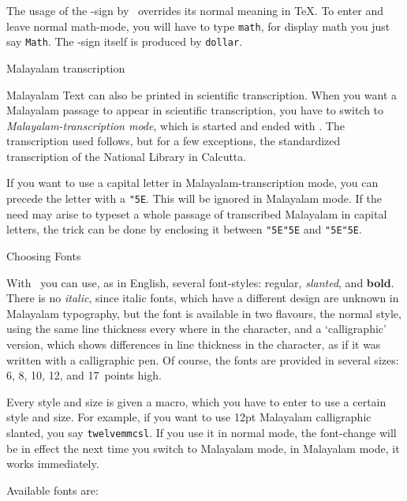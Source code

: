 The usage of the {\tt\dollar}-sign by \MT\ overrides its normal
meaning in
\TeX. To enter and leave normal math-mode, you will have to type
{\tt\bslash math}, for display math you just say {\tt\bslash Math}.
The \dollar-sign itself is produced by {\tt\bslash dollar}.

\beginsection Malayalam transcription

Malayalam Text can also be printed in scientific transcription.
When you want a Malayalam passage to appear in scientific
transcription, you have to switch to {\it Malayalam-transcription
mode}, which is started and ended with {\tt\dollar\dollar}. The
transcription used follows, but for a few exceptions, the
standardized transcription of the National Library in Calcutta.

If you want to use a capital letter in Malayalam-transcription mode,
you can precede the letter with a {\tt\char"5E}. This will be ignored
in Malayalam mode. If the need may arise to typeset a whole passage
of transcribed Malayalam in capital letters, the trick can be done
by enclosing it between  {\tt\char"5E\char"5E} and
{\tt\char"5E\char"5E}.

\beginsection Choosing Fonts

With \MT\ you can use, as in English, several font-styles:
regular, {\sl slanted}, and {\bf bold}. There is no {\it italic},
since italic fonts, which have a different design are unknown in
Malayalam typography, but the font is available in two flavours, the
normal style, using the same line thickness every where in the
character, and a `calligraphic' version, which shows differences in
line thickness in the character, as if it was written with a
calligraphic pen. Of course, the fonts are provided in several sizes:
6, 8, 10, 12, and 17~points high.

Every style and size is given a macro, which you have to enter to use
a certain style and size. For example, if you want to use 12pt
Malayalam calligraphic slanted, you say {\tt\bslash twelvemmcsl}. If
you use it in normal mode, the font-change will be in effect the next
time you switch to Malayalam mode, in Malayalam mode, it works
immediately.

Available fonts are:

